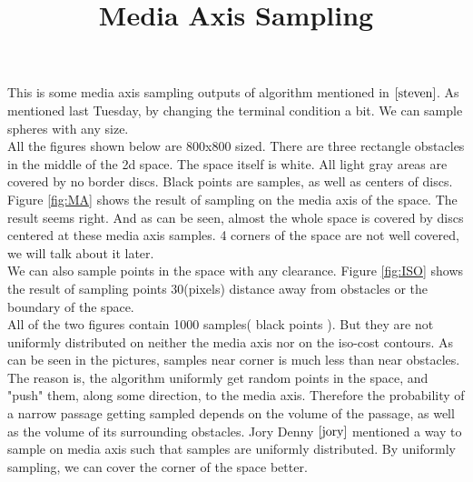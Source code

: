 \documentclass[12pt]{article}
\title{Media Axis Sampling}
\date{}
\begin{document}
  \maketitle
  
  This is some media axis sampling outputs of algorithm mentioned in $\cite{steven}$. As mentioned last Tuesday, by changing the terminal condition a bit. We can sample spheres with any size.\\
  
  All the figures shown below are 800x800 sized. There are three rectangle obstacles in the middle of the 2d space. The space itself is white. All light gray areas are covered by no border discs. Black points are samples, as well as centers of discs.\\
  
  Figure \ref{fig:MA} shows the result of sampling on the media axis of the space. The result seems right. And as can be seen, almost the whole space is covered by discs centered at these media axis samples. 4 corners of the space are not well covered, we will talk about it later.\\ 
  
  We can also sample points in the space with any clearance. Figure \ref{fig:ISO} shows the result of sampling points 30(pixels) distance away from obstacles or the boundary of the space.\\
  
   All of the two figures contain 1000 samples( black points ). But they are not uniformly distributed on neither the media axis nor on the iso-cost contours. As can be seen in the pictures, samples near corner is much less than near obstacles. The reason is, the algorithm uniformly get random points in the space, and "push" them, along some direction, to the media axis. Therefore the probability of a narrow passage getting sampled depends on the volume of the passage, as well as the volume of its surrounding obstacles. Jory Denny $\cite{jory}$ mentioned a way to sample on media axis such that samples are uniformly distributed. By uniformly sampling, we can cover the corner of the space better. \\
  
\end{document}
